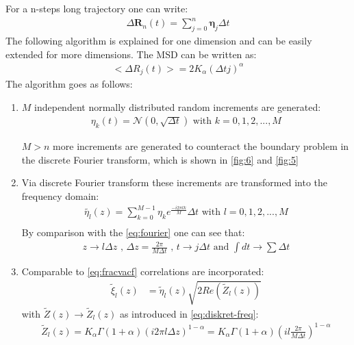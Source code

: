 \documentclass[
  a4paper,BCOR10mm,oneside,
  bibtotoc,idxtotoc,
  headsepline,footsepline,%
  fleqn,openbib
]{scrbook}
\begin{document}
For a n-steps long trajectory one can write:
\begin{align}
 \Delta \bm{R}_n(t) =  \sum_{j=0}^n \bm{\eta}_j  \Delta t \label{eq:diskretdeltar}
\end{align}
 The following algorithm is explained for one dimension and can be easily extended for more dimensions. The MSD can be written as:
\begin{align}
< \Delta R_{j}(t)>=2K_{\alpha} (\Delta t j)^{\alpha}
\end{align}
The algorithm goes as follows:
\begin{enumerate}
 \item $M$ independent normally distributed random increments are generated: 
\begin{align}
 \eta_k(t)= \mathcal{N}(0,\sqrt{\Delta t}) \text{  with  } k=0,1,2,...,M 
\end{align}

$M>n$  more increments are generated to counteract the boundary problem in the discrete Fourier transform, which is shown in \cref{fig:6} and \cref{fig:5}

\item Via discrete Fourier transform these increments are transformed into the frequency domain:
\begin{align}
 \tilde{\eta_l}(z)=\sum_{k=0}^{M-1} \eta_k e^{\frac{- i 2 \pi  l k }{M}} \Delta t   \text{  with  }  l=0,1,2,...,M  \label{eq:fouriertrans}\\ 
\end{align}
By comparison with the \cref{eq:fourier} one can see that:
\begin{align}
 z \rightarrow  l \Delta z \text{ , } \Delta z =   \frac{2 \pi }{M \Delta t} \text{ , } t \rightarrow j \Delta t \text{ and } \int dt \rightarrow \sum \Delta t \label{eq:diskret-freq} 
\end{align}
 
\item Comparable to \cref{eq:fracvacf} correlations are incorporated: 
 \begin{align}
   \tilde{\xi}_{l}(z)&= \tilde{\eta}_l(z) \sqrt{2 Re( \tilde{Z}_l(z))} \label{eq:problem} 
  \end{align}
 with $\tilde{Z}(z)\rightarrow \tilde{Z}_l(z)$ as introduced in \cref{eq:diskret-freq}:
  \begin{align}
   \tilde{Z}_l(z) = K_{\alpha} \Gamma(1+\alpha)(i 2 \pi l \Delta z)^{1-\alpha} =  K_{\alpha} \Gamma(1+\alpha)(i l \frac{ 2 \pi}{M \Delta t})^{1-\alpha} 
 \end{align}
 

\end{enumerate}
\end{document}
